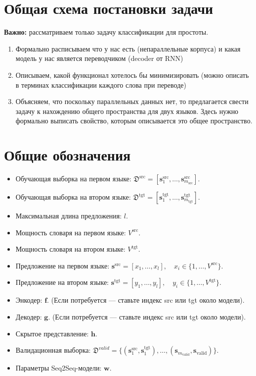 \documentclass[12pt,a4paper]{scrartcl}
\begin{document}
\section{Общая схема постановки задачи}
\textbf{Важно: } рассматриваем только задачу классификации для простоты.
\begin{enumerate}
\item Формально расписываем что у нас есть (непараллельные корпуса) и какая модель у нас является переводчиком (decoder от RNN)
\item Описываем, какой функционал хотелось бы минимизировать (можно описать в терминах классификации каждого слова при переводе)
\item Объясняем, что поскольку параллельных данных нет, то предлагается свести задачу к нахождению общего пространства для двух языков. Здесь нужно формально выписать свойство, которым описывается это общее пространство.
\end{enumerate}

\section{Общие обозначения}
\begin{itemize}
\item Обучающая выборка на первом языке: $\mathfrak{D}^{\text{src}} = [\mathbf{s}_1^{\text{src}}, \dots, \mathbf{s}_{m_\text{src}}^{\text{src}}].$
\item Обучающая выборка на втором языке: $\mathfrak{D}^{\text{tgt}} = [\mathbf{s}_1^{\text{tgt}}, \dots, \mathbf{s}_{m_\text{tgt}}^{\text{tgt}}].$
\item Максимальная длина предложения: $l$.
\item Мощность словаря на первом языке: $V^{\text{src}}$.
\item Мощность словаря на втором языке: $V^{\text{tgt}}$.
\item Предложение на первом языке: $\mathbf{s}^{\text{src}} = [x_1, \dots, x_l], \quad x_i \in \{1, \dots, V^{\text{src}}\}$. 
\item Предложение на втором языке: $\mathbf{s}^{\text{tgt}} = [y_1, \dots, y_l], \quad y_i \in \{1, \dots, V^{\text{tgt}}\}$. 
\item Энкодер: $\mathbf{f}$. (Если потребуется --- ставьте индекс src или tgt около модели).
\item Декодер: $\mathbf{g}$. (Если потребуется --- ставьте индекс src или tgt около модели).
\item Скрытое представление: $\mathbf{h}$.
\item Валидационная выборка: $\mathfrak{D}^{valid} = \{(\mathbf{s}_1^{\text{src}}, \mathbf{s}_1^{\text{tgt}}), \dots, (\mathbf{s}_{m_\text{valid}}, \mathbf{s}_\text{valid})\}.$
\item Параметры Seq2Seq-модели: $\mathbf{w}$.
\end{itemize}
\end{document}

